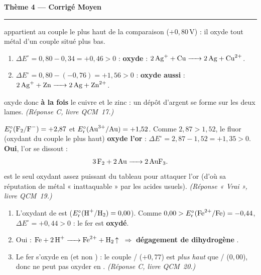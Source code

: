\documentclass[11pt,a4paper]{article}
\newcommand{\Ered}{\ensuremath{E_{\mathrm{r}}^{\circ}}}
\begin{document}
\begin{center}
{\LARGE\bfseries\color{primarydark}Thème 4 — Corrigé Moyen}\\[-2pt]
{\color{corrcol}\rule{\textwidth}{1pt}}
\end{center}

\begin{corr}
 appartient au couple le plus haut de la comparaison ($+0{,}80$\,V) : il oxyde tout métal
d'un couple situé plus bas.
\begin{enumerate}[label=(\alph*),leftmargin=2em,topsep=1pt,itemsep=1.5pt]
  \item $\Delta E^{\circ}=0{,}80-0{,}34=+0{,}46>0$ :  \textbf{oxyde}  :
        $\ce{2 Ag+ + Cu -> 2 Ag + Cu^{2+}}$.
  \item $\Delta E^{\circ}=0{,}80-(-0{,}76)=+1{,}56>0$ :  \textbf{oxyde aussi}  :
        $\ce{2 Ag+ + Zn -> 2 Ag + Zn^{2+}}$.
\end{enumerate}
 oxyde donc \textbf{à la fois} le cuivre et le zinc : un dépôt d'argent se forme sur les
deux lames. \emph{(Réponse C, livre QCM~17.)}
\end{corr}

\begin{corr}
$\Ered(\ce{F2}/\ce{F^-})=+2{,}87$ et $\Ered(\ce{Au^{3+}}/\ce{Au})=+1{,}52$.
Comme $2{,}87>1{,}52$, le fluor (oxydant du couple le plus haut) \textbf{oxyde l'or} :
$\Delta E^{\circ}=2{,}87-1{,}52=+1{,}35>0$. \textbf{Oui}, l'or se dissout :
\[
\ce{3 F2 + 2 Au -> 2 AuF3}.
\]
 est le seul oxydant assez puissant du tableau pour attaquer l'or (d'où sa réputation de
métal « inattaquable » par les acides usuels). \emph{(Réponse « Vrai », livre QCM~19.)}
\end{corr}

\begin{corr}
\begin{enumerate}[label=(\alph*),leftmargin=2em,topsep=1pt,itemsep=1.5pt]
  \item L'oxydant de  est  ($\Ered(\ce{H+}/\ce{H2})=0{,}00$).
        Comme $0{,}00>\Ered(\ce{Fe^{2+}}/\ce{Fe})=-0{,}44$, $\Delta E^{\circ}=+0{,}44>0$ : le fer est
        \textbf{oxydé}.
  \item Oui : $\ce{Fe + 2 H+ -> Fe^{2+} + H2 ^}$ $\Rightarrow$ \textbf{dégagement de dihydrogène }.
  \item Le fer s'oxyde en \textbf{} (et non ) : le couple /
        ($+0{,}77$) est \emph{plus haut} que / ($0{,}00$), donc  ne peut pas oxyder
         en . \emph{(Réponse C, livre QCM~20.)}
\end{enumerate}
\end{corr}
\end{document}
